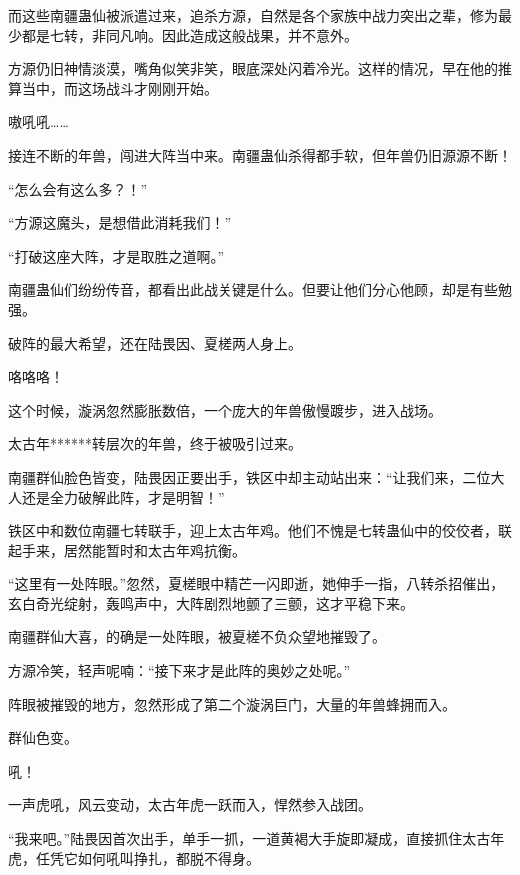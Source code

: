 \begin{this_body}
而这些南疆蛊仙被派遣过来，追杀方源，自然是各个家族中战力突出之辈，修为最少都是七转，非同凡响。因此造成这般战果，并不意外。

方源仍旧神情淡漠，嘴角似笑非笑，眼底深处闪着冷光。这样的情况，早在他的推算当中，而这场战斗才刚刚开始。

嗷吼吼……

接连不断的年兽，闯进大阵当中来。南疆蛊仙杀得都手软，但年兽仍旧源源不断！

“怎么会有这么多？！”

“方源这魔头，是想借此消耗我们！”

“打破这座大阵，才是取胜之道啊。”

南疆蛊仙们纷纷传音，都看出此战关键是什么。但要让他们分心他顾，却是有些勉强。

破阵的最大希望，还在陆畏因、夏槎两人身上。

咯咯咯！

这个时候，漩涡忽然膨胀数倍，一个庞大的年兽傲慢踱步，进入战场。

太古年******转层次的年兽，终于被吸引过来。

南疆群仙脸色皆变，陆畏因正要出手，铁区中却主动站出来：“让我们来，二位大人还是全力破解此阵，才是明智！”

铁区中和数位南疆七转联手，迎上太古年鸡。他们不愧是七转蛊仙中的佼佼者，联起手来，居然能暂时和太古年鸡抗衡。

“这里有一处阵眼。”忽然，夏槎眼中精芒一闪即逝，她伸手一指，八转杀招催出，玄白奇光绽射，轰鸣声中，大阵剧烈地颤了三颤，这才平稳下来。

南疆群仙大喜，的确是一处阵眼，被夏槎不负众望地摧毁了。

方源冷笑，轻声呢喃：“接下来才是此阵的奥妙之处呢。”

阵眼被摧毁的地方，忽然形成了第二个漩涡巨门，大量的年兽蜂拥而入。

群仙色变。

吼！

一声虎吼，风云变动，太古年虎一跃而入，悍然参入战团。

“我来吧。”陆畏因首次出手，单手一抓，一道黄褐大手旋即凝成，直接抓住太古年虎，任凭它如何吼叫挣扎，都脱不得身。

\end{this_body}

